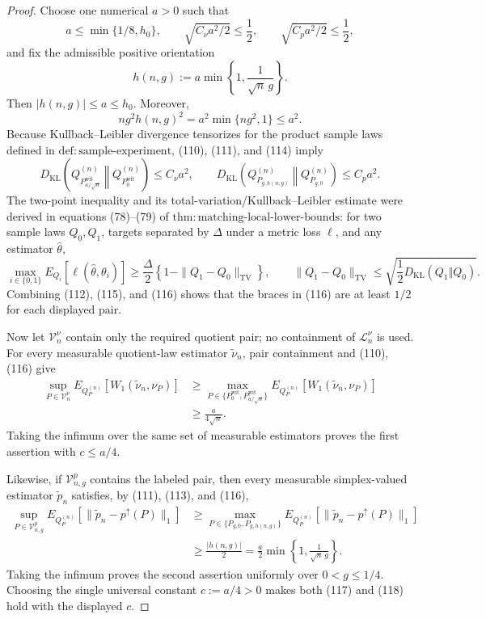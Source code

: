 \documentclass{article}
\begin{document}
\begin{proof}
Choose one numerical \(a>0\) such that
\[
a\le \min\{1/8,h_0\},
\qquad
\sqrt{C_{\nu}a^2/2}\le\frac12,
\qquad
\sqrt{C_pa^2/2}\le\frac12,                                             \tag{112}
\]
and fix the admissible positive orientation
\[
h(n,g):=a\min\left\{1,\frac1{\sqrt n\,g}\right\}.                       \tag{113}
\]
Then \(|h(n,g)|\le a\le h_0\).  Moreover,
\[
ng^2h(n,g)^2
=a^2\min\{ng^2,1\}\le a^2.                                             \tag{114}
\]
Because Kullback--Leibler divergence tensorizes for the product sample laws defined in \(\mathrm{def:sample\text{-}experiment}\), (110), (111), and (114) imply
\[
D_{\mathrm{KL}}\!\left(Q_{P_{a/\sqrt n}^{\mathrm{wit}}}^{(n)}
 \middle\Vert Q_{P_0^{\mathrm{wit}}}^{(n)}\right)\le C_{\nu}a^2,
\qquad
D_{\mathrm{KL}}\!\left(Q_{P_{g,h(n,g)}}^{(n)}
 \middle\Vert Q_{P_{g,0}}^{(n)}\right)\le C_pa^2.                        \tag{115}
\]
The two-point inequality and its total-variation/Kullback--Leibler estimate were derived in equations (78)--(79) of \(\mathrm{thm:matching\text{-}local\text{-}lower\text{-}bounds}\): for two sample laws \(Q_0,Q_1\), targets separated by \(\Delta\) under a metric loss \(\ell\), and any estimator \(\widehat\theta\),
\[
\max_{i\in\{0,1\}}E_{Q_i}\!\left[\ell(\widehat\theta,\theta_i)\right]
\ge \frac{\Delta}{2}\left\{1-\|Q_1-Q_0\|_{\mathrm{TV}}\right\},
\qquad
\|Q_1-Q_0\|_{\mathrm{TV}}
\le\sqrt{\frac12D_{\mathrm{KL}}(Q_1\Vert Q_0)}.                         \tag{116}
\]
Combining (112), (115), and (116) shows that the braces in (116) are at least \(1/2\) for each displayed pair.

Now let \(\mathcal V_n^\nu\) contain only the required quotient pair; no containment of \(\mathcal L_n^\nu\) is used.  For every measurable quotient-law estimator \(\widetilde\nu_n\), pair containment and (110), (116) give
\[
\begin{aligned}
\sup_{P\in\mathcal V_n^\nu}
 E_{Q_P^{(n)}}\!\left[W_1(\widetilde\nu_n,\nu_P)\right]
&\ge
\max_{P\in\{P_0^{\mathrm{wit}},P_{a/\sqrt n}^{\mathrm{wit}}\}}
 E_{Q_P^{(n)}}\!\left[W_1(\widetilde\nu_n,\nu_P)\right]\\
&\ge \frac{a}{4\sqrt n}.                                                  \tag{117}
\end{aligned}
\]
Taking the infimum over the same set of measurable estimators proves the first assertion with \(c\le a/4\).

Likewise, if \(\mathcal V_{n,g}^p\) contains the labeled pair, then every measurable simplex-valued estimator \(\widetilde p_n\) satisfies, by (111), (113), and (116),
\[
\begin{aligned}
\sup_{P\in\mathcal V_{n,g}^p}
 E_{Q_P^{(n)}}\!\left[
 \|\widetilde p_n-p^{\uparrow}(P)\|_1\right]
&\ge
\max_{P\in\{P_{g,0},P_{g,h(n,g)}\}}
 E_{Q_P^{(n)}}\!\left[
 \|\widetilde p_n-p^{\uparrow}(P)\|_1\right]\\
&\ge \frac{|h(n,g)|}{2}
=\frac a2\min\left\{1,\frac1{\sqrt n\,g}\right\}.                    \tag{118}
\end{aligned}
\]
Taking the infimum proves the second assertion uniformly over \(0<g\le1/4\).  Choosing the single universal constant \(c:=a/4>0\) makes both (117) and (118) hold with the displayed \(c\).


\end{proof}
\end{document}
